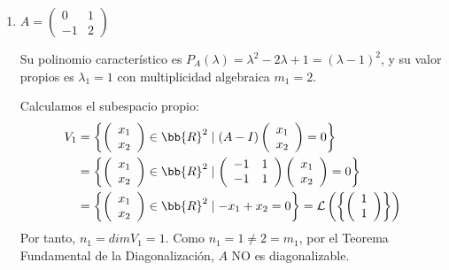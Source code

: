 \begin{ejemplo}
\begin{enumerate}
        \item $A = \left( \begin{array}{cc}
            0 & 1 \\
            -1 & 2
        \end{array}\right)$

        Su polinomio característico es $P_A(\lambda) =\lambda^2 -2\lambda +1 = (\lambda-1)^2$, y su valor propios es $\lambda_1=1$ con multiplicidad algebraica $m_1=2$.

        Calculamos el subespacio propio:
       \begin{equation*}\begin{split}
           V_1 & = \left\{ \left(\begin{array}{c}
                x_1 \\
                x_2 
           \end{array}\right) \in \bb{R}^2 \mid (A-I)\left(\begin{array}{c}
                x_1 \\
                x_2 
           \end{array}\right) = 0 \right\} \\
           & = \left\{ \left(\begin{array}{c}
                x_1 \\
                x_2 
           \end{array}\right) \in \bb{R}^2 \mid \left( \begin{array}{cc}
            -1 & 1 \\
            -1 & 1
        \end{array}\right) \left(\begin{array}{c}
                x_1 \\
                x_2 
           \end{array}\right) = 0 \right\} \\
           & = \left\{ \left(\begin{array}{c}
                x_1 \\
                x_2 
           \end{array}\right) \in \bb{R}^2 \mid -x_1+x_2=0 \right\} = \mathcal{L}\left(\left\{ \left(\begin{array}{c}
                1 \\
                1 
           \end{array}\right)\right\}\right)
       \end{split}\end{equation*}
       Por tanto, $n_1 = dim V_1 = 1$. Como $n_1 = 1 \neq 2 = m_1$, por el Teorema Fundamental de la Diagonalización, $A$ NO es diagonalizable.
    \end{enumerate}
\end{ejemplo}


